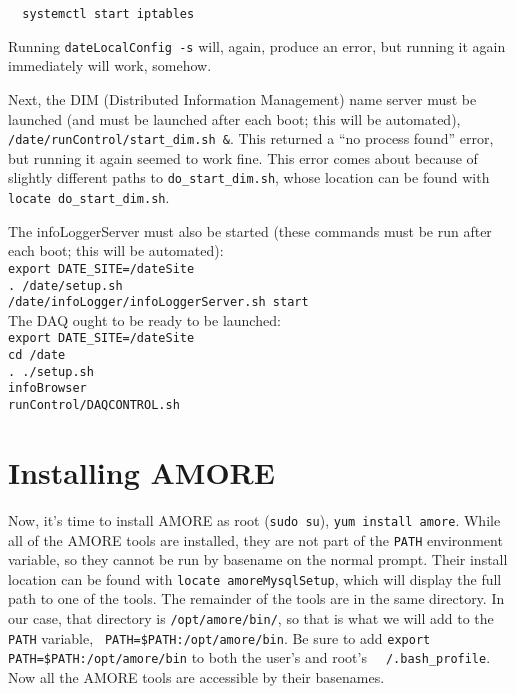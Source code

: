 \documentclass[12pt]{article}
\begin{document}
\begin{verbatim}
  systemctl start iptables
\end{verbatim}

Running {\tt dateLocalConfig -s} will, again, produce an error, but
running it again immediately will work, somehow.

\qq Next, the DIM (Distributed Information Management) name server must be
launched (and must be launched after each boot; this will be automated), {\tt
  /date/runControl/start\_dim.sh \&}. This returned a ``no process found'' error,
but running it again seemed to work fine. This error comes about because of
slightly different paths to {\tt do\_start\_dim.sh}, whose location can be found
with {\tt locate do\_start\_dim.sh}.

\qq The infoLoggerServer must also be started (these commands must be run after
each boot; this will be automated):\\
{\tt export DATE\_SITE=/dateSite} \\
{\tt . /date/setup.sh} \\
{\tt /date/infoLogger/infoLoggerServer.sh start} \\

\qq The DAQ ought to be ready to be launched:\\
{\tt export DATE\_SITE=/dateSite}\\
{\tt cd /date} \\
{\tt . ./setup.sh}\\
{\tt infoBrowser}\\
{\tt runControl/DAQCONTROL.sh}\\

\section{Installing AMORE}

\qq Now, it's time to install AMORE as root ({\tt sudo su}), {\tt yum install
  amore}. While all of the AMORE tools are installed, they are not part of the
{\tt PATH} environment variable, so they cannot be run by basename on the normal
prompt. Their install location can be found with {\tt locate amoreMysqlSetup},
which will display the full path to one of the tools. The remainder of the tools
are in the same directory. In our case, that directory is {\tt /opt/amore/bin/},
so that is what we will add to the {\tt PATH} variable, {\tt
  PATH=\$PATH:/opt/amore/bin}. Be sure to add {\tt export
  PATH=\$PATH:/opt/amore/bin} to both the user's and root's {\tt
  ~/.bash\_profile}. Now all the AMORE tools are accessible by their
basenames.
\end{document}
